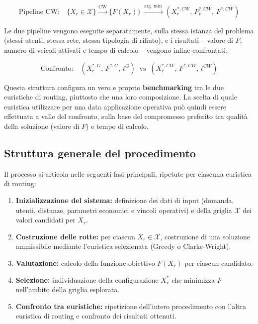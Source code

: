 \begin{equation}
	\text{Pipeline CW:} \quad \{X_r \in \mathcal{X}\} \xrightarrow{\text{CW}} \{F(X_r)\} \xrightarrow{\arg\min} (X_r^{*,CW},\,P_v^{*,CW},\,F^{*,CW})
\end{equation}

Le due pipeline vengono eseguite separatamente, sulla stessa istanza del problema (stessi utenti, stessa rete, stessa tipologia di rifiuto), e i risultati -- valore di $F$, numero di veicoli attivati e tempo di calcolo -- vengono infine confrontati:

\begin{equation}
	\text{Confronto:} \quad (X_r^{*,G},\,F^{*,G},\,t^{G}) \;\; \text{vs} \;\; (X_r^{*,CW},\,F^{*,CW},\,t^{CW})
\end{equation}

Questa struttura configura un vero e proprio \textbf{benchmarking} tra le due euristiche di routing, piuttosto che una loro composizione. La scelta di quale euristica utilizzare per una data applicazione operativa può quindi essere effettuata a valle del confronto, sulla base del compromesso preferito tra qualità della soluzione (valore di $F$) e tempo di calcolo.

\subsection*{Struttura generale del procedimento}

Il processo si articola nelle seguenti fasi principali, ripetute per ciascuna euristica di routing:

\begin{enumerate}
	\item \textbf{Inizializzazione del sistema:} definizione dei dati di input (domanda, utenti, distanze, parametri economici e vincoli operativi) e della griglia $\mathcal{X}$ dei valori candidati per $X_r$.
	
	\item \textbf{Costruzione delle rotte:} per ciascun $X_r \in \mathcal{X}$, costruzione di una soluzione ammissibile mediante l'euristica selezionata (Greedy o Clarke-Wright).
	
	\item \textbf{Valutazione:} calcolo della funzione obiettivo $F(X_r)$ per ciascun candidato.
	
	\item \textbf{Selezione:} individuazione della configurazione $X_r^{*}$ che minimizza $F$ nell'ambito della griglia esplorata.
	
	\item \textbf{Confronto tra euristiche:} ripetizione dell'intero procedimento con l'altra euristica di routing e confronto dei risultati ottenuti.
\end{enumerate}

